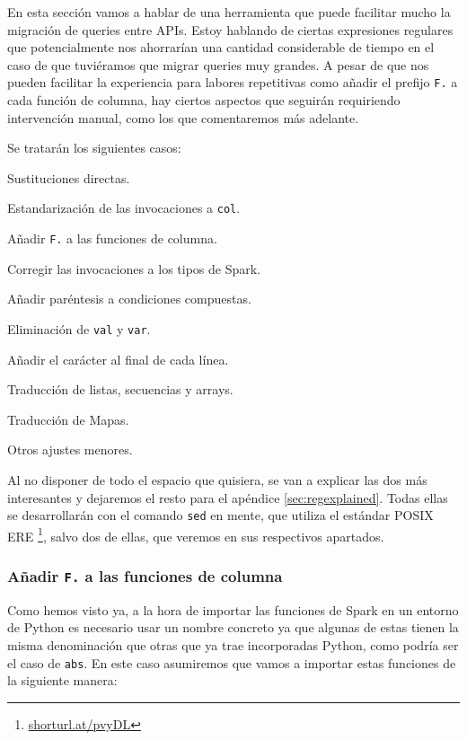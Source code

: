 \documentclass[12pt,twoside,titlepage]{report}
\begin{document}
En esta sección vamos a hablar de una herramienta que puede facilitar mucho la migración de queries entre APIs. Estoy hablando de ciertas expresiones regulares que potencialmente nos ahorrarían una cantidad considerable de tiempo en el caso de que tuviéramos que migrar queries muy grandes. A pesar de que nos pueden facilitar la experiencia para labores repetitivas como añadir el prefijo \texttt{F.} a cada función de columna, hay ciertos aspectos que seguirán requiriendo intervención manual, como los que comentaremos más adelante.

Se tratarán los siguientes casos:

\begin{compactitem}
	\item Sustituciones directas.
	\item Estandarización de las invocaciones a \texttt{col}.
	\item Añadir \texttt{F.} a las funciones de columna.
	\item Corregir las invocaciones a los tipos de Spark.
	\item Añadir paréntesis a condiciones compuestas.
	\item Eliminación de \texttt{val} y \texttt{var}.
	\item Añadir el carácter \texttt{} al final de cada línea.
	\item Traducción de listas, secuencias y arrays.
	\item Traducción de Mapas.
	\item Otros ajustes menores.
\end{compactitem}

Al no disponer de todo el espacio que quisiera, se van a explicar las dos más interesantes y dejaremos el resto para el apéndice \ref{sec:regexplained}. Todas ellas se desarrollarán con el comando \texttt{sed} en mente, que utiliza el estándar POSIX ERE \footnote{\url{shorturl.at/pvyDL}}, salvo dos de ellas, que veremos en sus respectivos apartados.

\subsubsection{Añadir \texttt{F.} a las funciones de columna}

Como hemos visto ya, a la hora de importar las funciones de Spark en un entorno de Python es necesario usar un nombre concreto ya que algunas de estas tienen la misma denominación que otras que ya trae incorporadas Python, como podría ser el caso de \texttt{abs}. En este caso asumiremos que vamos a importar estas funciones de la siguiente manera:
\end{document}
